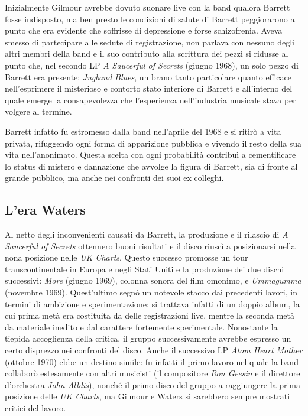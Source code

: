 \documentclass[class=book, crop=false, oneside, 12pt]{standalone}
\begin{document}
    Inizialmente Gilmour avrebbe dovuto suonare live con la band qualora Barrett fosse indisposto, ma ben presto le condizioni di salute di Barrett peggiorarono al punto che era evidente che soffrisse di depressione e forse schizofrenia. Aveva smesso di partecipare alle sedute di registrazione, non parlava con nessuno degli altri membri della band e il suo contributo alla scrittura dei pezzi si ridusse al punto che, nel secondo LP \emph{A Saucerful of Secrets} (giugno 1968), un solo pezzo di Barrett era presente: \emph{Jugband Blues}, un brano tanto particolare quanto efficace nell'esprimere il misterioso e contorto stato interiore di Barrett e all'interno del quale emerge la consapevolezza che l'esperienza nell'industria musicale stava per volgere al termine.

    Barrett infatto fu estromesso dalla band nell'aprile del 1968 e si ritirò a vita privata, rifuggendo ogni forma di apparizione pubblica e vivendo il resto della sua vita nell'anonimato. Questa scelta con ogni probabilità contribuì a cementificare lo status di mistero e dannazione che avvolge la figura di Barrett, sia di fronte al grande pubblico, ma anche nei confronti dei suoi ex colleghi.

    \subsection{L'era Waters}
    Al netto degli inconvenienti causati da Barrett, la produzione e il rilascio di \emph{A Saucerful of Secrets} ottennero buoni risultati e il disco riuscì a posizionarsi nella nona posizione nelle \emph{UK Charts}. Questo successo promosse un tour transcontinentale in Europa e negli Stati Uniti e la produzione dei due dischi successivi: \emph{More} (giugno 1969), colonna sonora del film omonimo, e \emph{Ummagumma} (novembre 1969). Quest'ultimo segnò un notevole stacco dai precedenti lavori, in termini di ambizione e sperimentazione: si trattava infatti di un doppio album, la cui prima metà era costituita da delle registrazioni live, mentre la seconda metà da materiale inedito e dal carattere fortemente sperimentale. Nonostante la tiepida accoglienza della critica, il gruppo successivamente avrebbe espresso un certo disprezzo nei confronti del disco. Anche il successivo LP  \emph{Atom Heart Mother} (ottobre 1970) ebbe un destino simile: fu infatti il primo lavoro nel quale la band collaborò estesamente con altri musicisti (il compositore \emph{Ron Geesin} e il direttore d'orchestra \emph{John Alldis}), nonché il primo disco del gruppo a raggiungere la prima posizione delle \emph{UK Charts}, ma Gilmour e Waters si sarebbero sempre mostrati critici del lavoro.
\end{document}
